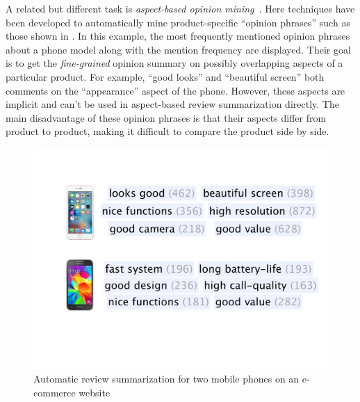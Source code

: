 %

A related but different task is \textit{aspect-based opinion 
	mining}~\cite{su2008hidden,zeng2013classification}. 
Here techniques have been developed to automatically mine
product-specific ``opinion phrases'' such as those shown in 
.
In this example, the most frequently mentioned opinion phrases
about a phone model along with the mention frequency
are displayed. 
Their goal is to get the {\em fine-grained} opinion summary on
possibly overlapping aspects of a particular product.
For example, ``good looks'' and ``beautiful screen'' both comments
on the ``appearance'' aspect of the phone. However, these aspects
are implicit and can't be used in aspect-based review summarization
directly. The main disadvantage of these opinion phrases is that
their aspects differ from product to product, making it difficult to
compare the product side by side. 

\begin{figure}[th]
	\centering
	\includegraphics[width=0.8\columnwidth]{figures/phrases}
	\caption{Automatic review summarization for two mobile phones 
		on an e-commerce website}
	\label{fig:phrases}
\end{figure}

%


